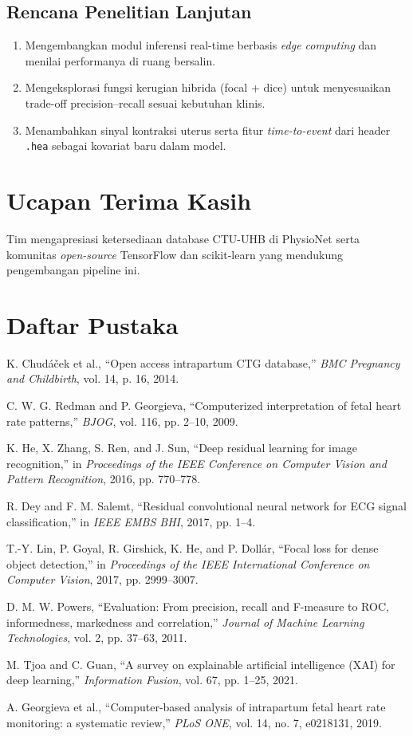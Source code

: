 \documentclass[12pt,a4paper]{article}
\begin{document}
\subsection{Rencana Penelitian Lanjutan}
\begin{enumerate}[label=\arabic*)]
    \item Mengembangkan modul inferensi real-time berbasis \textit{edge computing} dan menilai performanya di ruang bersalin.
    \item Mengeksplorasi fungsi kerugian hibrida (focal + dice) untuk menyesuaikan trade-off precision--recall sesuai kebutuhan klinis.
    \item Menambahkan sinyal kontraksi uterus serta fitur \textit{time-to-event} dari header \texttt{.hea} sebagai kovariat baru dalam model.
\end{enumerate}

\section*{Ucapan Terima Kasih}
Tim mengapresiasi ketersediaan database CTU-UHB di PhysioNet serta komunitas \textit{open-source} TensorFlow dan scikit-learn yang mendukung pengembangan pipeline ini.

\section*{Daftar Pustaka}
\begin{enumerate}[label={[\arabic*]}]
    \item K. Chudáček et al., ``Open access intrapartum CTG database,'' \textit{BMC Pregnancy and Childbirth}, vol. 14, p. 16, 2014.
    \item C. W. G. Redman and P. Georgieva, ``Computerized interpretation of fetal heart rate patterns,'' \textit{BJOG}, vol. 116, pp. 2--10, 2009.
    \item K. He, X. Zhang, S. Ren, and J. Sun, ``Deep residual learning for image recognition,'' in \textit{Proceedings of the IEEE Conference on Computer Vision and Pattern Recognition}, 2016, pp. 770--778.
    \item R. Dey and F. M. Salemt, ``Residual convolutional neural network for ECG signal classification,'' in \textit{IEEE EMBS BHI}, 2017, pp. 1--4.
    \item T.-Y. Lin, P. Goyal, R. Girshick, K. He, and P. Dollár, ``Focal loss for dense object detection,'' in \textit{Proceedings of the IEEE International Conference on Computer Vision}, 2017, pp. 2999--3007.
    \item D. M. W. Powers, ``Evaluation: From precision, recall and F-measure to ROC, informedness, markedness and correlation,'' \textit{Journal of Machine Learning Technologies}, vol. 2, pp. 37--63, 2011.
    \item M. Tjoa and C. Guan, ``A survey on explainable artificial intelligence (XAI) for deep learning,'' \textit{Information Fusion}, vol. 67, pp. 1--25, 2021.
    \item A. Georgieva et al., ``Computer-based analysis of intrapartum fetal heart rate monitoring: a systematic review,'' \textit{PLoS ONE}, vol. 14, no. 7, e0218131, 2019.
\end{enumerate}
\end{document}
